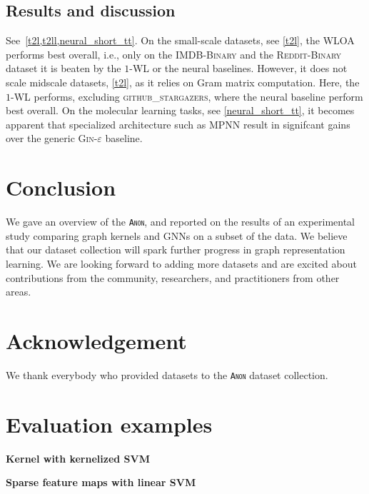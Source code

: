 \documentclass{article}
\newcommand{\xhdr}[1]{{\noindent\bfseries #1}}
\theoremstyle{definition}
\begin{document}
\subsection{Results and discussion}
See~\cref{t2l,t2ll,neural_short_tt}. On the small-scale datasets, see \cref{t2l}, the \textsc{WLOA} performs best overall, i.e., only on the \textsc{IMDB-Binary} and the \textsc{Reddit-Binary} dataset it is beaten by the $1$-\textsc{WL} or the neural baselines. However, it does not scale midscale datasets, \cref{t2l}, as it relies on Gram matrix computation. Here, the $1$-WL performs, excluding \textsc{github\_stargazers}, where the neural baseline perform best overall. On the molecular learning tasks, see \cref{neural_short_tt}, it becomes apparent that specialized architecture such as \textsc{MPNN} result in signifcant gains over the generic \textsc{Gin-$\varepsilon$} baseline. 

\section{Conclusion}

We gave an overview of the \textsc{\texttt{Anon}}, and reported on the results of an experimental study comparing graph kernels and GNNs on a subset of the data. We believe that our dataset collection will spark further progress in graph representation learning. We are looking forward to adding more datasets and are excited about contributions from the community, researchers, and practitioners from other areas.

\section{Acknowledgement}

We thank everybody who provided datasets to the  \textsc{\texttt{Anon}} dataset collection.




\appendix

\onecolumn



\section{Evaluation examples}

\xhdr{Kernel with kernelized SVM}


\xhdr{Sparse feature maps with linear SVM}

\end{document}
